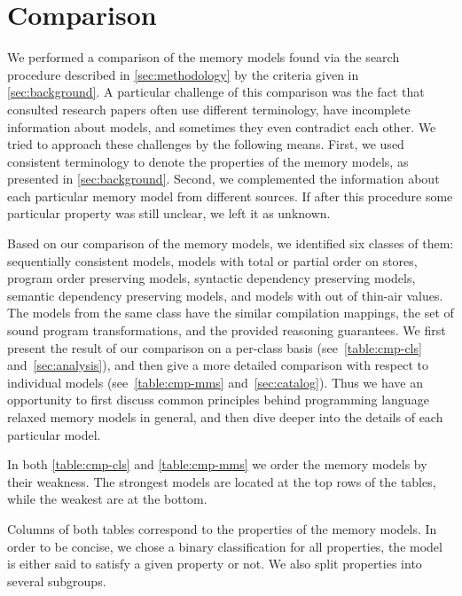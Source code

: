 \section{Comparison}
\label{sec:comparison}

We performed a comparison of the memory models 
found via the search procedure described in \cref{sec:methodology} 
by the criteria given in \cref{sec:background}. 
A particular challenge of this comparison was the fact that 
consulted research papers often use different terminology, 
have incomplete information about models, and 
sometimes they even contradict each other. 
We tried to approach these challenges by the following means.
First, we used consistent terminology 
to denote the properties of the memory models, 
as presented in \cref{sec:background}.
Second, we complemented the information about 
each particular memory model from different sources.
If after this procedure some particular property 
was still unclear, we left it as unknown. 

Based on our comparison of the memory models, 
we identified six classes of them:
sequentially consistent models,
models with total or partial order on stores,
program order preserving models, 
syntactic dependency preserving models, 
semantic dependency preserving models, 
and models with out of thin-air values. 
The models from the same class have the similar compilation mappings, 
the set of sound program transformations, and the provided reasoning guarantees.
We first present the result of our comparison on a per-class basis 
(see~\cref{table:cmp-cls} and~\cref{sec:analysis}), and 
then give a more detailed comparison with respect to individual models
(see~\cref{table:cmp-mms} and~\cref{sec:catalog}).
Thus we have an opportunity to first discuss common principles
behind programming language relaxed memory models in general, 
and then dive deeper into the details of each particular model. 



In both \cref{table:cmp-cls} and \cref{table:cmp-mms} we order
the memory models by their weakness.  
The strongest models are located at the top rows of the tables, 
while the weakest are at the bottom.  

Columns of both tables correspond 
to the properties of the memory models.
In order to be concise, we chose a binary classification for all properties,
\ie the model is either said to satisfy a given property or not.  
We also split properties into several subgroups.

